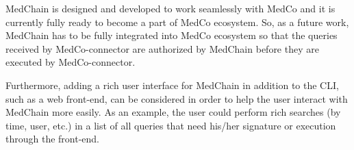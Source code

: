 % 

MedChain is designed and developed to work seamlessly with MedCo and it is currently fully ready to become a part of MedCo ecosystem. So, as a future work, MedChain has to be fully integrated into MedCo ecosystem so that the queries received by MedCo-connector are authorized by MedChain before they are executed by MedCo-connector. 

Furthermore, adding a rich user interface for MedChain in addition to the CLI, such as a web front-end, can be considered in order to help the user interact with MedChain more easily. As an example, the user could perform rich searches (by time, user, etc.) in a list of all queries that need his/her signature or execution through the front-end. 







